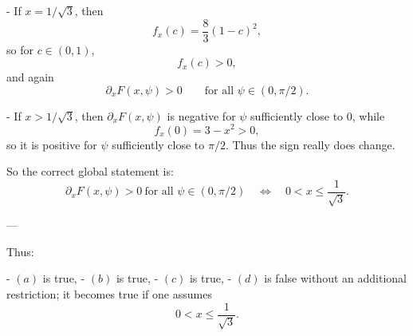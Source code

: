 - If $x=1/\sqrt3$, then
  \[
  f_x(c)=\frac83(1-c)^2,
  \]
  so for $c\in(0,1)$,
  \[
  f_x(c)>0,
  \]
  and again
  \[
  \partial_x F(x,\psi)>0
  \qquad\text{for all }\psi\in(0,\pi/2).
  \]

- If $x>1/\sqrt3$, then $\partial_x F(x,\psi)$ is negative for $\psi$ sufficiently close to $0$, while
  \[
  f_x(0)=3-x^2>0,
  \]
  so it is positive for $\psi$ sufficiently close to $\pi/2$. Thus the sign really does change.

So the correct global statement is:
\[
\partial_x F(x,\psi)>0\ \text{for all }\psi\in(0,\pi/2)
\quad\Longleftrightarrow\quad
0<x\le \frac1{\sqrt3}.
\]

---

Thus:

- $(a)$ is true,
- $(b)$ is true,
- $(c)$ is true,
- $(d)$ is false without an additional restriction; it becomes true if one assumes
  \[
  0<x\le \frac1{\sqrt3}.
  \]

